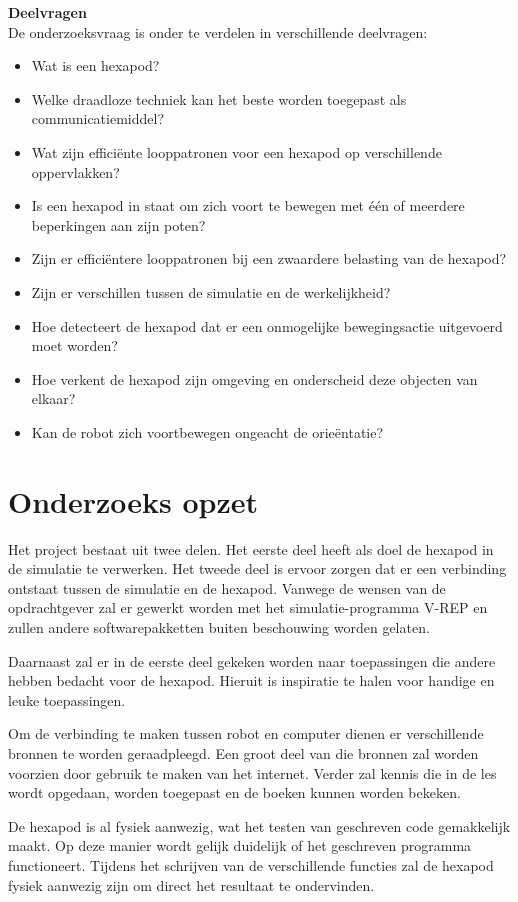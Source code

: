 \documentclass[10pt,a4paper]{article}
\begin{document}
\textbf{Deelvragen\\}
De onderzoeksvraag is onder te verdelen in verschillende deelvragen:
\begin{itemize}
\setlength\itemsep{0em}
\item Wat is een hexapod?
\item Welke draadloze techniek kan het beste worden toegepast als communicatiemiddel?
\item Wat zijn effici\"ente looppatronen voor een hexapod op verschillende oppervlakken?
\item Is een hexapod in staat om zich voort te bewegen met één of meerdere beperkingen aan zijn poten?
\item Zijn er effici\"entere looppatronen bij een zwaardere belasting van de hexapod?
\item Zijn er verschillen tussen de simulatie en de werkelijkheid?
\item Hoe detecteert de hexapod dat er een onmogelijke bewegingsactie uitgevoerd moet worden?
\item Hoe verkent de hexapod zijn omgeving en onderscheid deze objecten van elkaar?
\item Kan de robot zich voortbewegen ongeacht de orie\"entatie?
\end{itemize}
\fi

\section{Onderzoeks opzet}
Het project bestaat uit twee delen. Het eerste deel heeft als doel de hexapod in de simulatie te verwerken. Het tweede deel is ervoor zorgen dat er een verbinding ontstaat tussen de simulatie en de hexapod. 
Vanwege de wensen van de opdrachtgever zal er gewerkt worden met het simulatie-programma V-REP en zullen andere softwarepakketten buiten beschouwing worden gelaten.  

Daarnaast zal er in de eerste deel gekeken worden naar toepassingen die andere hebben bedacht voor de hexapod. Hieruit is inspiratie te halen voor handige en leuke toepassingen.

Om de verbinding te maken tussen robot en computer dienen er verschillende bronnen te worden geraadpleegd. Een groot deel van die bronnen zal worden voorzien door gebruik te maken van het internet. Verder zal kennis die in de les wordt opgedaan, worden toegepast en de boeken kunnen worden bekeken.


De hexapod is al fysiek aanwezig, wat het testen van geschreven code gemakkelijk maakt. Op deze manier wordt gelijk duidelijk of het geschreven programma functioneert. Tijdens het schrijven van de verschillende functies zal de hexapod fysiek aanwezig zijn om direct het resultaat te ondervinden.
\end{document}

